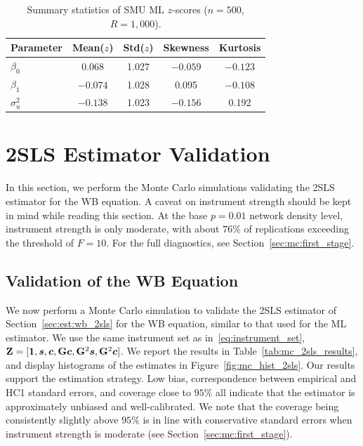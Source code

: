 \begin{table}[htbp]
\centering
\caption[Summary statistics of SMU ML $z$-scores]{Summary statistics of SMU ML $z$-scores ($n = 500$, $R = 1{,}000$).}
\label{tab:mc_zscores_smu}
\begin{tabular}{lcccc}
\toprule
Parameter & Mean($z$) & Std($z$) & Skewness & Kurtosis \\
\midrule
$\beta_0$ & 0.068 & 1.027 & $-0.059$ & $-0.123$ \\
$\beta_1$ & $-0.074$ & 1.028 & 0.095 & $-0.108$ \\
$\sigma_u^2$ & $-0.138$ & 1.023 & $-0.156$ & 0.192 \\
\bottomrule
\end{tabular}
\end{table}

\section{2SLS Estimator Validation}
\label{sec:mc:2sls}
In this section, we perform the Monte Carlo simulations validating the 2SLS estimator for the WB equation. A caveat on instrument strength should be kept in mind while reading this section. At the base $p = 0.01$ network density level, instrument strength is only moderate, with about $76\%$ of replications exceeding the \textcite[p.~557]{Staiger1997} threshold of $F = 10$. For the full diagnostics, see Section~\ref{sec:mc:first_stage}.

\subsection{Validation of the WB Equation}
\label{sec:mc:2sls_wb}
We now perform a Monte Carlo simulation to validate the 2SLS estimator of Section~\ref{sec:est:wb_2sls} for the WB equation, similar to that used for the ML estimator. We use the same instrument set as in~\eqref{eq:instrument_set}, $\mathbf{Z} = [\bm{1}, \bm{s}, \bm{c}, \mathbf{G}\bm{c}, \mathbf{G}^2\bm{s}, \mathbf{G}^2\bm{c}]$. We report the results in Table~\ref{tab:mc_2sls_results}, and display histograms of the estimates in Figure~\ref{fig:mc_hist_2sls}. Our results support the estimation strategy. Low bias, correspondence between empirical and HC1 standard errors, and coverage close to $95\%$ all indicate that the estimator is approximately unbiased and well-calibrated. We note that the coverage being consistently slightly above $95\%$ is in line with conservative standard errors when instrument strength is moderate (see Section~\ref{sec:mc:first_stage}).

